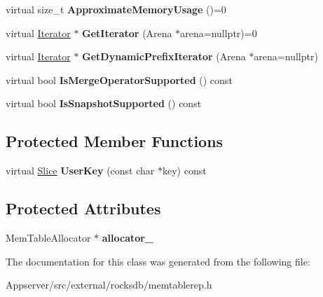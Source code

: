 \begin{DoxyCompactItemize}
\item 
virtual size\+\_\+t {\bfseries Approximate\+Memory\+Usage} ()=0\hypertarget{classrocksdb_1_1MemTableRep_a5a313a7730104e94f4c60e0cf2818241}{}\label{classrocksdb_1_1MemTableRep_a5a313a7730104e94f4c60e0cf2818241}

\item 
virtual \hyperlink{classrocksdb_1_1MemTableRep_1_1Iterator}{Iterator} $\ast$ {\bfseries Get\+Iterator} (Arena $\ast$arena=nullptr)=0\hypertarget{classrocksdb_1_1MemTableRep_a512847e7a3f7b77f738c97a04b92ef44}{}\label{classrocksdb_1_1MemTableRep_a512847e7a3f7b77f738c97a04b92ef44}

\item 
virtual \hyperlink{classrocksdb_1_1MemTableRep_1_1Iterator}{Iterator} $\ast$ {\bfseries Get\+Dynamic\+Prefix\+Iterator} (Arena $\ast$arena=nullptr)\hypertarget{classrocksdb_1_1MemTableRep_a1d2ba3bbc72fa104828a7df394fb0d22}{}\label{classrocksdb_1_1MemTableRep_a1d2ba3bbc72fa104828a7df394fb0d22}

\item 
virtual bool {\bfseries Is\+Merge\+Operator\+Supported} () const\hypertarget{classrocksdb_1_1MemTableRep_a32a54039ec9337b1449b2fb02c7b32f1}{}\label{classrocksdb_1_1MemTableRep_a32a54039ec9337b1449b2fb02c7b32f1}

\item 
virtual bool {\bfseries Is\+Snapshot\+Supported} () const\hypertarget{classrocksdb_1_1MemTableRep_a808715ac901ddabeb55afdee56df4867}{}\label{classrocksdb_1_1MemTableRep_a808715ac901ddabeb55afdee56df4867}

\end{DoxyCompactItemize}
\subsection*{Protected Member Functions}
\begin{DoxyCompactItemize}
\item 
virtual \hyperlink{classrocksdb_1_1Slice}{Slice} {\bfseries User\+Key} (const char $\ast$key) const\hypertarget{classrocksdb_1_1MemTableRep_a7879bba15f89e0af854770e955839fe0}{}\label{classrocksdb_1_1MemTableRep_a7879bba15f89e0af854770e955839fe0}

\end{DoxyCompactItemize}
\subsection*{Protected Attributes}
\begin{DoxyCompactItemize}
\item 
Mem\+Table\+Allocator $\ast$ {\bfseries allocator\+\_\+}\hypertarget{classrocksdb_1_1MemTableRep_a100849cbb84764e4b83cbaf8fc54a2d6}{}\label{classrocksdb_1_1MemTableRep_a100849cbb84764e4b83cbaf8fc54a2d6}

\end{DoxyCompactItemize}


The documentation for this class was generated from the following file\+:\begin{DoxyCompactItemize}
\item 
Appserver/src/external/rocksdb/memtablerep.\+h\end{DoxyCompactItemize}
